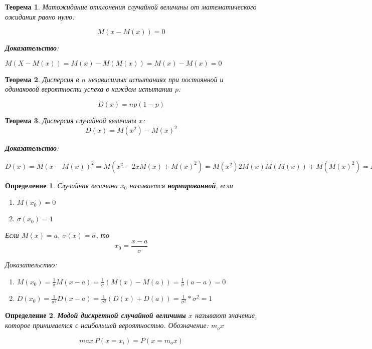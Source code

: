 \documentclass{article}
\newtheorem{definition}{Определение}
\newtheorem{theorem}{Теорема}
\begin{document}
\begin{theorem}
    Матожидание отклонения случайной величины от математического ожидания равно нулю:

    $$M(x - M(x)) = 0$$

    \textbf{Доказательство}:

    $M(X - M(x)) = M(x) - M(M(x)) = M(x) - M(x) = 0$
\end{theorem}

\begin{theorem}
    Дисперсия в $n$ независимых испытаниях при постоянной и одинаковой вероятности успеха в каждом испытании $p$:

    $$D(x) = np(1-p)$$
\end{theorem}

\begin{theorem}
    Дисперсия случайной величины $x$:
    $$D(x) = M(x^2) - M(x)^2$$

    \textbf{Доказательство}:

    $D(x) = M(x - M(x))^2 = M(x^2 - 2xM(x) + M(x)^2) = M(x^2) 2 M(x) M(M(x)) + M(M(x)^2) = M(x^2) - M(x)^2$
\end{theorem}

\begin{definition}
    Случайная величина $x_0$ называется \textbf{нормированной}, если
    
    \begin{enumerate}
        \item $M(x_0) = 0$
        \item $\sigma(x_0) = 1$
    \end{enumerate}

    Если $M(x) = a$, $\sigma(x) = \sigma$, то $$x_{0} = \frac{x - a}{\sigma}$$

    Доказательство:
    
    \begin{enumerate}
        \item $M(x_0) = \frac{1}{\sigma} M(x - a) = \frac{1}{\sigma} (M(x) - M(a)) = \frac{1}{\sigma} (a - a) = 0$
        \item $D(x_0) = \frac{1}{\sigma^2} D(x - a) = \frac{1}{\sigma^2} (D(x) + D(a)) = \frac{1}{\sigma^2} * \sigma^2 = 1$
    \end{enumerate}
\end{definition}

\begin{definition}
    \textbf{Модой дискретной случайной величины} $x$ называют значение, которое принимается с наибольшей вероятностью. Обозначение: $m_o x$

    $$max \ P(x = x_i) = P(x = m_o x)$$
\end{definition}
\end{document}
